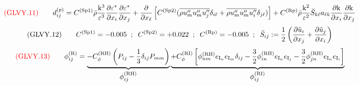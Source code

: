 \documentclass{article}
\begin{document}
\begin{equation}
{\color{red}{({\rm GLVY}.11)}}\qquad
d_{ij}^{(p)}=C^{(\mathrm{\tiny Sp1})}\bar\rho\frac{\mathrm{k}^3 }
                                                {\varepsilon^3}\frac{\partial\varepsilon^*}
                                                                    {\partial x_i         }\frac{\partial\varepsilon^*}
                                                                                                 {\partial x_j         }
            +\frac{\partial       }
                   {\partial x_\ell}\left[C^{(\mathrm{\tiny Sp2})}(\overline{\rho u_m''u_m''u_j''}\delta_{i\ell}
                                                                +\overline{\rho u_m''u_m''u_i''}\delta_{j\ell})\right]
            +C^{(\mathrm{\tiny Rp})}\bar\rho\frac{\mathrm{k}^2 }
                                              {\varepsilon^2}\breve{S}_{k\ell}a_{\ell k}\frac{\partial\mathrm{k}}
                                                                                             {\partial x_i      }\frac{\partial\mathrm{k}}
                                                                                                                      {\partial x_j      }
\end{equation}
\begin{equation}
({\rm GLVY}.12)\qquad
C^{(\mathrm{\tiny Sp1})}=-0.005\;\; ; \;\;
C^{(\mathrm{\tiny Sp2})}=+0.022\;\; ; \;\;
C^{(\mathrm{\tiny Rp })}=-0.005\;\; ; \;\;
\breve S_{ij}:=\frac{1}{2}\left(\frac{\partial\hat u_i}{\partial x_j}
                               +\frac{\partial\hat u_j}{\partial x_i}\right)
\end{equation}
\begin{equation}
{\color{red}{({\rm GLVY}.13)}}\qquad
\phi_{ij}^{(\mathrm{\tiny R})}=\underbrace{-C_\phi^{(\mathrm{\tiny RH})}\left(P_{ij}-\frac{1}{3}\delta_{ij} P_{mm}\right)}_{\displaystyle\phi^{(\mathrm{\tiny RH})}_{ij}}
                       \underbrace{+C_\phi^{(\mathrm{\tiny RI})}\left[            \phi^{(\mathrm{\tiny RH})}_{nm}e_{\mathrm{\tiny I}_n}e_{\mathrm{\tiny I}_m}\delta_{ij}
                                                            -\frac{3}{2}\phi^{(\mathrm{\tiny RH})}_{in}e_{\mathrm{\tiny I}_n}e_{\mathrm{\tiny I}_j}
                                                            -\frac{3}{2}\phi^{(\mathrm{\tiny RH})}_{jn}e_{\mathrm{\tiny I}_n}e_{\mathrm{\tiny I}_i}\right]}_{\displaystyle\phi^{(\mathrm{\tiny RI})}_{ij}}
\end{equation}
\end{document}
